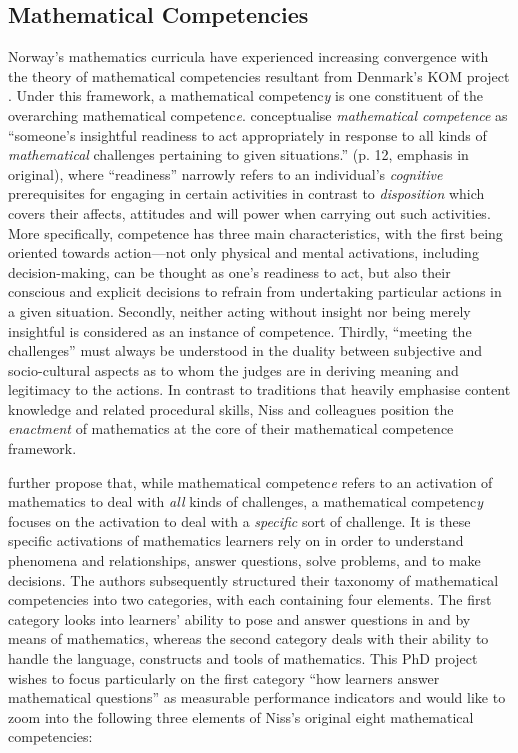 \documentclass[
    a4paper,                %
    11pt,                   %
    stu,                    %
    donotrepeattitle,       %
    floatsintext,           %
    biblatex,               %
    colorlinks=true,        %
    linkcolor=red,          %
    anchorcolor=black,      %
    citecolor=blue,         %
    urlcolor=blue,          %
    bookmarks=true,         %
    bookmarksopen=false,    %
    bookmarksnumbered=true, %
    dvipsnames              %
]{apa7}
\begin{document}
\subsection{Mathematical Competencies}

Norway's mathematics curricula have experienced increasing convergence with the theory of mathematical competencies resultant from Denmark's KOM project \parencite{niss:2003,niss:2011,niss:2019}. Under this framework, a mathematical competenc\emph{y} is one constituent of the overarching mathematical competenc\emph{e}. \textcite{niss:2019} conceptualise \emph{mathematical competence} as ``someone's insightful readiness to act appropriately in response to all kinds of \emph{mathematical} challenges pertaining to given situations.'' (p. 12, emphasis in original), where ``readiness'' narrowly refers to an individual's \emph{cognitive} prerequisites for engaging in certain activities in contrast to \emph{disposition} which covers their affects, attitudes and will power when carrying out such activities. More specifically, competence has three main characteristics, with the first being oriented towards action---not only physical and mental activations, including decision-making, can be thought as one's readiness to act, but also their conscious and explicit decisions to refrain from undertaking particular actions in a given situation. Secondly, neither acting without insight nor being merely insightful is considered as an instance of competence. Thirdly, ``meeting the challenges'' must always be understood in the duality between subjective and socio-cultural aspects as to whom the judges are in deriving meaning and legitimacy to the actions. In contrast to traditions that heavily emphasise content knowledge and related procedural skills, Niss and colleagues position the \emph{enactment} of mathematics at the core of their mathematical competence framework.

\textcite{niss:2019} further propose that, while mathematical competenc\emph{e} refers to an activation of mathematics to deal with \emph{all} kinds of challenges, a mathematical competenc\emph{y} focuses on the activation to deal with a \emph{specific} sort of challenge. It is these specific activations of mathematics learners rely on in order to understand phenomena and relationships, answer questions, solve problems, and to make decisions. The authors subsequently structured their taxonomy of mathematical competencies into two categories, with each containing four elements. The first category looks into learners' ability to pose and answer questions in and by means of mathematics, whereas the second category deals with their ability to handle the language, constructs and tools of mathematics. This PhD project wishes to focus particularly on the first category ``how learners answer mathematical questions'' as measurable performance indicators and would like to zoom into the following three elements of Niss's original eight mathematical competencies:
\end{document}
